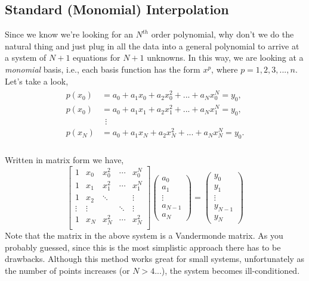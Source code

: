 \documentclass[paper=a4, fontsize=11pt]{scrartcl} %
\numberwithin{equation}{section} %
\numberwithin{figure}{section} %
\numberwithin{table}{section} %
\begin{document}
%
%
%
%
%
%
\subsection{Standard (Monomial) Interpolation}

$ $\\

Since we know we're looking for an $N^{th}$ order polynomial, why don't we do the natural thing and just plug in all the data into a general polynomial to arrive at a system of $N+1$ equations for $N+1$ unknowns. In this way, we are looking at a \emph{monomial} basis, i.e., each basis function has the form $x^p$, where $p=1,2,3,...,n.$ Let's take a look,
\begin{align}
\nonumber
\begin{split}
p(x_0) &= a_0 + a_1 x_{0} + a_2 x_0^2 +...+ a_N x_0^N = y_0, \\
p(x_0) &= a_0 + a_1 x_{1} + a_2 x_1^2 +...+ a_N x_1^N = y_0, \\
&\ \ \vdots \\
p(x_N) &= a_0 + a_1 x_{N} + a_2 x_N^2 +...+ a_N x_N^N = y_0. \\
\end{split}
\end{align}

Written in matrix form we have,
$$\left[ \begin{array}{ccccc}
1 & x_0 & x_0^2 & \cdots & x_0^N \\
1& x_1 & x_1^2 &  \cdots & x_1^N \\
1 & x_2 & \ddots &            & \vdots \\
\vdots & \vdots & & \ddots & \vdots \\
1 & x_N & x_N^2 & \cdots & x_N^2 \\ 
\end{array} \right] %
%
\left( \begin{array}{c}
a_{0} \\
a_{1} \\
\vdots \\
a_{N-1} \\
a_{N}
\end{array} \right) =  
%
\left( \begin{array}{c}
y_{0} \\
y_{1} \\
\vdots \\
y_{N-1} \\
y_{N}
\end{array} \right)$$
%
%
Note that the matrix in the above system is a Vandermonde matrix. As you probably guessed, since this is the most simplistic approach there has to be drawbacks. Although this method works great for small systems, unfortunately as the number of points increases (or $N>4$...), the system becomes ill-conditioned. \\
\end{document}
